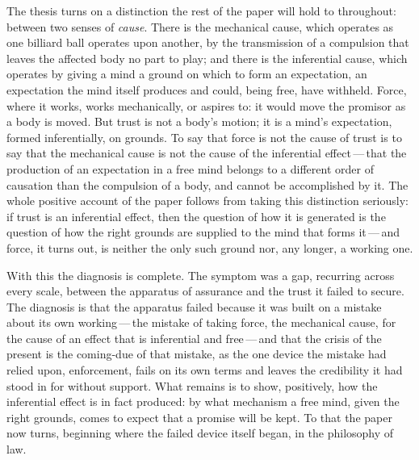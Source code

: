 The thesis turns on a distinction the rest of the paper will hold to throughout: between two senses of \emph{cause}. There is the mechanical cause, which operates as one billiard ball operates upon another, by the transmission of a compulsion that leaves the affected body no part to play; and there is the inferential cause, which operates by giving a mind a ground on which to form an expectation, an expectation the mind itself produces and could, being free, have withheld. Force, where it works, works mechanically, or aspires to: it would move the promisor as a body is moved. But trust is not a body's motion; it is a mind's expectation, formed inferentially, on grounds. To say that force is not the cause of trust is to say that the mechanical cause is not the cause of the inferential effect\,---\,that the production of an expectation in a free mind belongs to a different order of causation than the compulsion of a body, and cannot be accomplished by it. The whole positive account of the paper follows from taking this distinction seriously: if trust is an inferential effect, then the question of how it is generated is the question of how the right grounds are supplied to the mind that forms it\,---\,and force, it turns out, is neither the only such ground nor, any longer, a working one.

With this the diagnosis is complete. The symptom was a gap, recurring across every scale, between the apparatus of assurance and the trust it failed to secure. The diagnosis is that the apparatus failed because it was built on a mistake about its own working\,---\,the mistake of taking force, the mechanical cause, for the cause of an effect that is inferential and free\,---\,and that the crisis of the present is the coming-due of that mistake, as the one device the mistake had relied upon, enforcement, fails on its own terms and leaves the credibility it had stood in for without support. What remains is to show, positively, how the inferential effect is in fact produced: by what mechanism a free mind, given the right grounds, comes to expect that a promise will be kept. To that the paper now turns, beginning where the failed device itself began, in the philosophy of law.
